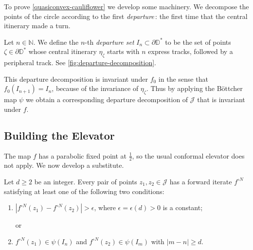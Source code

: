 \iffalse
Quantitatively, %
decompose the central itinerary into its constituent tracks $\eta_z = \gamma _1 +\gamma_2 +\ldots,$
then we have the bound $$
and decompose its central itinerary into tracks, 
$$\eta_\zeta = \gamma _1 +\gamma_2 +\ldots.$$
Then
$$\Length(\psi(\gamma_{k}))\lesssim\theta^{-k}$$ uniformly in
$\zeta$, for some constant $\theta=\theta(c)>1$.	
\fi

To prove \cref{quasiconvex-cauliflower} we develop some machinery. We decompose the points of the circle according to the first \emph{departure}\,: the first time that the central itinerary made a turn.



\begin{definition}
Let $n \in \mathbb N$. We define the $n$-th \emph{departure set} $I_n \subset \partial \mathbb D ^*$ to be the set of points $\zeta \in \partial \mathbb D^*$ whose central itinerary $\eta_{\zeta}$ starts with $n$ express tracks, followed by a peripheral track.
See \cref{fig:departure-decomposition}.
\end{definition}

This departure decomposition is invariant under $f_0$ in the sense that $f_0(I_{n+1})=I_n$, because of the invariance of $\eta _\zeta$.
Thus by applying the Böttcher map $\psi$ we obtain a corresponding departure decomposition of $\mathcal J$ that is invariant under $f$.

\subsection{Building the Elevator}

The map $f$ has a parabolic fixed point at $\frac 12$, so the usual conformal elevator does not apply. We now develop a substitute.

\begin{theorem} \label{parabolic-elevator}
	Let $d\geq 2$ be an integer. Every pair of points $z_1,z_2 \in \mathcal J$ has a forward iterate $f^{\circ N}$ satisfying at least one of the following two conditions:
	\begin{enumerate}[label=\normalfont(\roman*)]
		\item $\left|f^{\circ N}(z_1)-f^{\circ N}(z_2)\right|>\epsilon$, where $\epsilon=\epsilon(d)>0$ is a constant;
		
		or
		\item $f^{\circ N }(z_1) \in \psi(I_n)$ and $f^{\circ N }(z_2) \in \psi(I_m)$ with $|m-n| \geq d$.
	\end{enumerate}
\end{theorem}

